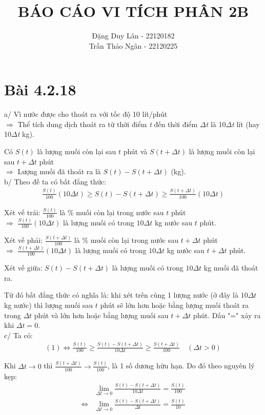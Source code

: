 \documentclass[a4paper,12pt]{report}
\title{BÁO CÁO VI TÍCH PHÂN 2B}
\author{Đặng Duy Lân - 22120182\\Trần Thảo Ngân - 22120225}
\begin{document}
\maketitle
\section*{Bài 4.2.18}
a/ Vì nước được cho thoát ra với tốc độ 10 lít/phút
\\
$\Rightarrow$ Thể tích dung dịch thoát ra từ thời điểm \emph{t} đến thời điểm $\Delta$\emph{t} là 10$\Delta$\emph{t} lít (hay 10$\Delta$\emph{t} kg). 

Có $S(t)$ là lượng muối còn lại sau $t$ phút và $S(t + \Delta t)$ là lượng muối còn lại sau $t + \Delta t$ phút
\\
$\Rightarrow$ Lượng muối đã thoát ra là $S(t) - S(t + \Delta t)$ (kg).
\\
b/ Theo đề ta có bất đẳng thức:
\begin{align}
    \frac{S(t)}{100}(10\Delta t) \ge S(t) - S(t + \Delta t) \ge \frac{S(t + \Delta t)}{100}(10\Delta t)
\end{align}

Xét vế trái: $\frac{S(t)}{100}$ là \% muối còn lại trong nước sau $t$ phút
\\
$\Rightarrow$ $\frac{S(t)}{100} (10 \Delta t)$ là lượng muối có trong $10 \Delta t$ kg nước sau $t$ phút.

Xét vế phải: $\frac{S(t + \Delta t)}{100}$ là \% muối còn lại trong nước sau $t + \Delta t$ phút
\\
$\Rightarrow$ $\frac{S(t + \Delta t)}{100} (10 \Delta t)$ là lượng muối có trong $10 \Delta t$ kg nước sau $t + \Delta t$ phút.

Xét vế giữa: $S(t) - S(t + \Delta t)$ là lượng muối có trong $10\Delta t$ kg muối đã thoát ra.

Từ đó bất đẳng thức có nghĩa là: khi xét trên cùng 1 lượng nước (ở đây là $10\Delta t$ kg nước) thì lượng muối sau $t$ phút sẽ lớn hơn hoặc bằng lượng muối thoát ra trong $\Delta t$ phút và lớn hơn hoặc bằng lượng muối sau $t + \Delta t$ phút. Dấu "=" xảy ra khi $\Delta t = 0$.
\\
c/ Ta có: 
\begin{align*}
(1) \Longleftrightarrow \frac{S(t)}{100} \ge \frac{S(t) - S(t + \Delta t)}{10\Delta t} \ge \frac{S(t + \Delta t)}{100} \quad(\Delta t > 0)
\end{align*}

Khi $\Delta t \to 0$ thì $\frac{S(t + \Delta t)}{100} \to \frac{S(t)}{100}$, là 1 số dương hữu hạn. Do đó theo nguyên lý kẹp:
\begin{align*}
    &\lim_{\Delta t \to 0} \frac{S(t) - S(t + \Delta t)}{10\Delta t} = \frac{S(t)}{100}\\
    \Longleftrightarrow &\lim_{\Delta t \to 0} \frac{S(t) - S(t + \Delta t)}{\Delta t} = \frac{S(t)}{10}
\end{align*}
\end{document}
